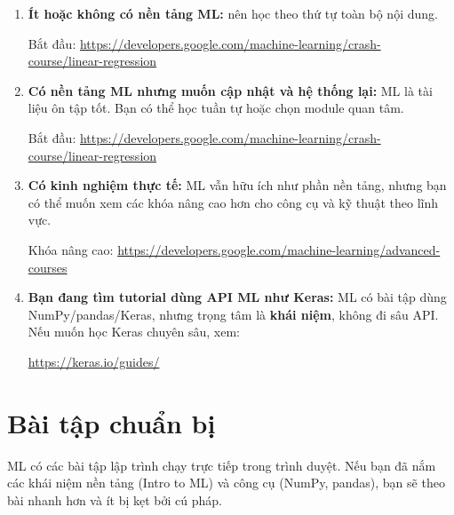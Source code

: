 \documentclass[12pt,a4paper]{article}
\newcommand{\mlccurl}[1]{\url{#1}}
\begin{document}
\begin{phuongphap}[title={Các trường hợp thường gặp (theo ML)}]
\begin{enumerate}
  \item \textbf{Ít hoặc không có nền tảng ML:} nên học theo thứ tự toàn bộ nội dung.

  Bắt đầu: \mlccurl{https://developers.google.com/machine-learning/crash-course/linear-regression}

  \item \textbf{Có nền tảng ML nhưng muốn cập nhật và hệ thống lại:} ML là tài liệu ôn tập tốt. Bạn có thể học tuần tự hoặc chọn module quan tâm.

  Bắt đầu: \mlccurl{https://developers.google.com/machine-learning/crash-course/linear-regression}

  \item \textbf{Có kinh nghiệm thực tế:} ML vẫn hữu ích như phần nền tảng, nhưng bạn có thể muốn xem các khóa nâng cao hơn cho công cụ và kỹ thuật theo lĩnh vực.

  Khóa nâng cao: \mlccurl{https://developers.google.com/machine-learning/advanced-courses}

  \item \textbf{Bạn đang tìm tutorial dùng API ML như Keras:} ML có bài tập dùng NumPy/pandas/Keras, nhưng trọng tâm là \textbf{khái niệm}, không đi sâu API. Nếu muốn học Keras chuyên sâu, xem:

  \mlccurl{https://keras.io/guides/}
\end{enumerate}
\end{phuongphap}

\newpage

\section{Bài tập chuẩn bị}

\begin{dongco}[title={Chuẩn bị đúng giúp học nhanh}]
ML có các bài tập lập trình chạy trực tiếp trong trình duyệt. Nếu bạn đã nắm các khái niệm nền tảng (Intro to ML) và công cụ (NumPy, pandas), bạn sẽ theo bài nhanh hơn và ít bị kẹt bởi cú pháp.
\end{dongco}
\end{document}
